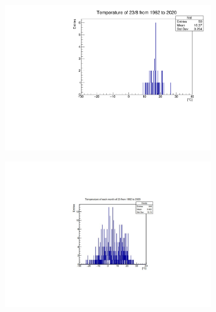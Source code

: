 \documentclass[a4, 12pt]{article}
\begin{document}
\begin{figure}[H]
\centering
\begin{subfigure}{.5\textwidth}
  \centering
  \captionsetup{width = 0.9\linewidth}
  \includegraphics[width=0.9\linewidth]{chrisFig1.pdf}
   \caption*{}
\end{subfigure}\hfill
\begin{subfigure}{.5\textwidth}
  \centering
  \captionsetup{width = 0.9\linewidth}
  \includegraphics[width=1.5\linewidth]{chrisFig3.pdf}
  \caption*{}
\end{subfigure}

\end{figure}
\end{document}
